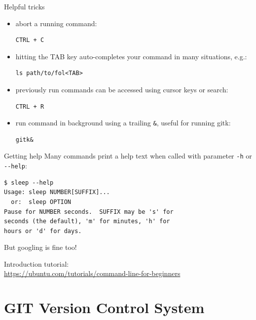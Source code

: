 \begin{frame}[fragile]{Helpful tricks}
    \begin{itemize}
        \item abort a running command:
            \begin{verbatim}CTRL + C\end{verbatim}
        \item hitting the TAB key auto-completes your command in many situations, e.g.:
            \begin{verbatim}ls path/to/fol<TAB>\end{verbatim}
        \item previously run commands can be accessed using cursor keys or search:
            \begin{verbatim}CTRL + R\end{verbatim}
        \item run command in background using a trailing \verb|&|, useful for running gitk:
            \begin{verbatim}gitk&\end{verbatim}
    \end{itemize}
\end{frame}


\begin{frame}[fragile]{Getting help}
    Many commands print a help text when called with parameter \verb|-h| or \verb|--help|:
\begin{verbatim}$ sleep --help
Usage: sleep NUMBER[SUFFIX]...
  or:  sleep OPTION
Pause for NUMBER seconds.  SUFFIX may be 's' for
seconds (the default), 'm' for minutes, 'h' for
hours or 'd' for days.
\end{verbatim}

\bigskip
\pause

But googling is fine too!

\bigskip
\pause
Introduction tutorial:\\
\href{https://ubuntu.com/tutorials/command-line-for-beginners}{https://ubuntu.com/tutorials/command-line-for-beginners}

\end{frame}


\section{GIT Version Control System}


